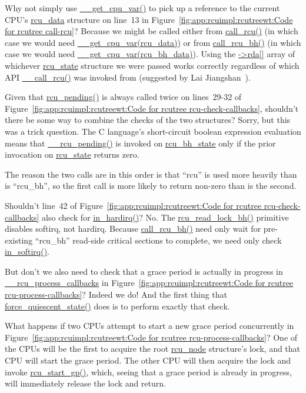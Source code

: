 \QuickQ{}
	Why not simply use \url{__get_cpu_var()} to pick up a
	reference to the
	current CPU's \url{rcu_data} structure on line~13 in
	Figure~\ref{fig:app:rcuimpl:rcutreewt:Code for rcutree call-rcu}?
\QuickA{}
	Because we might be called either from \url{call_rcu()}
	(in which case we would need \url{__get_cpu_var(rcu_data)})
	or from \url{call_rcu_bh()} (in which case we would need
	\url{__get_cpu_var(rcu_bh_data)}).
	Using the \url{->rda[]} array of whichever
	\url{rcu_state} structure we were passed works correctly
	regardless of which API \url{__call_rcu()} was invoked from
	(suggested by Lai Jiangshan~\cite{LaiJiangshan2008NewClassicAlgorithm}).

\QuickQ{}
	Given that \url{rcu_pending()} is always called twice
	on lines~29-32 of
	Figure~\ref{fig:app:rcuimpl:rcutreewt:Code for rcutree rcu-check-callbacks},
	shouldn't there be some way to combine the checks of the
	two structures?
\QuickA{}
	Sorry, but this was a trick question.
	The C language's short-circuit boolean expression evaluation
	means that \url{__rcu_pending()} is invoked on
	\url{rcu_bh_state} only if the prior invocation on
	\url{rcu_state} returns zero.

	The reason the two calls are in this order is that
	``rcu'' is used more heavily than is ``rcu\_bh'', so
	the first call is more likely to return non-zero than
	is the second.

\QuickQ{}
	Shouldn't line~42 of
	Figure~\ref{fig:app:rcuimpl:rcutreewt:Code for rcutree rcu-check-callbacks}
	also check for \url{in_hardirq()}?
\QuickA{}
	No.
	The \url{rcu_read_lock_bh()} primitive disables
	softirq, not hardirq.
	Because \url{call_rcu_bh()} need only wait for pre-existing
	``rcu\_bh'' read-side critical sections to complete,
	we need only check \url{in_softirq()}.

\QuickQ{}
	But don't we also need to check that a grace period is
	actually in progress in \url{__rcu_process_callbacks} in
	Figure~\ref{fig:app:rcuimpl:rcutreewt:Code for rcutree rcu-process-callbacks}?
\QuickA{}
	Indeed we do!
	And the first thing that \url{force_quiescent_state()} does
	is to perform exactly that check.

\QuickQ{}
	What happens if two CPUs attempt to start a new grace
	period concurrently in
	Figure~\ref{fig:app:rcuimpl:rcutreewt:Code for rcutree rcu-process-callbacks}?
\QuickA{}
	One of the CPUs will be the first to acquire the root
	\url{rcu_node} structure's lock, and that CPU will start
	the grace period.
	The other CPU will then acquire the lock and invoke
	\url{rcu_start_gp()}, which, seeing that a grace period
	is already in progress, will immediately release the
	lock and return.

